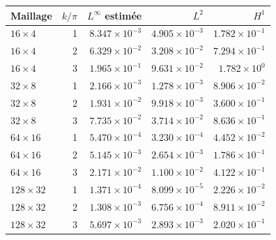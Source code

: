 \begin{tabular}{lrrrr}
\toprule
Maillage & \(k/\pi\) & \(L^\infty\) estimée & \(L^2\) & \(H^1\) \\
\midrule
\(16\times4\) & 1 & \(8.347\times10^{-3}\) & \(4.905\times10^{-3}\) & \(1.782\times10^{-1}\) \\
\(16\times4\) & 2 & \(6.329\times10^{-2}\) & \(3.208\times10^{-2}\) & \(7.294\times10^{-1}\) \\
\(16\times4\) & 3 & \(1.965\times10^{-1}\) & \(9.631\times10^{-2}\) & \(1.782\times10^{0}\) \\
\(32\times8\) & 1 & \(2.166\times10^{-3}\) & \(1.278\times10^{-3}\) & \(8.906\times10^{-2}\) \\
\(32\times8\) & 2 & \(1.931\times10^{-2}\) & \(9.918\times10^{-3}\) & \(3.600\times10^{-1}\) \\
\(32\times8\) & 3 & \(7.735\times10^{-2}\) & \(3.714\times10^{-2}\) & \(8.636\times10^{-1}\) \\
\(64\times16\) & 1 & \(5.470\times10^{-4}\) & \(3.230\times10^{-4}\) & \(4.452\times10^{-2}\) \\
\(64\times16\) & 2 & \(5.145\times10^{-3}\) & \(2.654\times10^{-3}\) & \(1.786\times10^{-1}\) \\
\(64\times16\) & 3 & \(2.171\times10^{-2}\) & \(1.100\times10^{-2}\) & \(4.122\times10^{-1}\) \\
\(128\times32\) & 1 & \(1.371\times10^{-4}\) & \(8.099\times10^{-5}\) & \(2.226\times10^{-2}\) \\
\(128\times32\) & 2 & \(1.308\times10^{-3}\) & \(6.756\times10^{-4}\) & \(8.911\times10^{-2}\) \\
\(128\times32\) & 3 & \(5.697\times10^{-3}\) & \(2.893\times10^{-3}\) & \(2.020\times10^{-1}\) \\
\bottomrule
\end{tabular}
